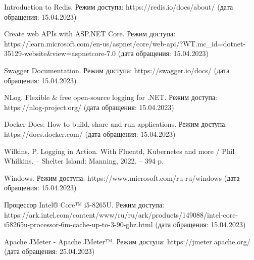 \begin{thebibliography}{}
    Introduction to Redis. Режим доступа: https://redis.io/docs/about/ (дата обращения: 15.04.2023)
    
    Create web APIs with ASP.NET Core. Режим доступа: https://learn.microsoft.com/en-us/aspnet/core/web-api/?WT.mc\_id=dotnet-35129-website\&view=aspnetcore-7.0 (дата обращения: 15.04.2023)
    
    Swagger Documentation. Режим доступа: https://swagger.io/docs/ (дата обращения: 15.04.2023)
    
    NLog. Flexible \& free open-source logging for .NET. Режим доступа: https://nlog-project.org/ (дата обращения: 15.04.2023)
    
    Docker Docs: How to build, share and run applications. Режим доступа: https://docs.docker.com/ (дата обращения: 15.04.2023)
    
    Wilkins, P. Logging in Action. With Fluentd, Kubernetes and more / Phil Whilkins. -- Shelter Island: Manning, 2022. -- 394 p.
    
    Windows. Режим доступа: https://www.microsoft.com/ru-ru/windows (дата обращения: 15.04.2023)
    
    Процессор Intel® Core™ i5-8265U. Режим доступа: https://ark.intel.com/content/www/ru/ru/ark/products/149088/intel-core-i58265u-processor-6m-cache-up-to-3-90-ghz.html (дата обращения: 15.04.2023)
    
    Apache JMeter - Apache JMeter™. Режим доступа: https://jmeter.apache.org/ (дата обращения: 25.04.2023)
    
\end{thebibliography}
\endgroup

\pagebreak